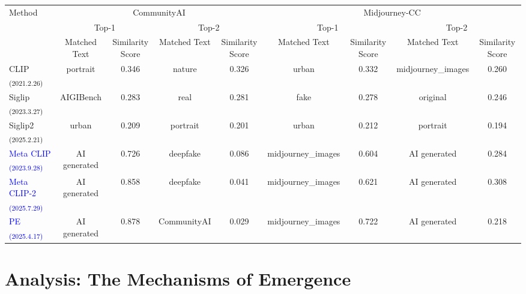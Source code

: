 \documentclass[sigconf,screen]{acmart}
\theoremstyle{plain}
\theoremstyle{definition}
\theoremstyle{remark}
\begin{document}
\begin{table}[th!]
\begin{adjustbox}{width=0.95\linewidth}
\begin{tabular}{l|cccccccc}
  \bottomrule
  \multirow{3}{*}{Method} & \multicolumn{4}{c}{CommunityAI}& \multicolumn{4}{c}{Midjourney-CC} \\
  \cmidrule(r){2-5} \cmidrule(r){6-9}
   & \multicolumn{2}{c}{Top-1} & \multicolumn{2}{c}{Top-2} & \multicolumn{2}{c}{Top-1} & \multicolumn{2}{c}{Top-2} \\
      \cmidrule(r){2-3} \cmidrule(r){4-5} \cmidrule{6-7} \cmidrule{8-9}

&Matched Text& Similarity Score&Matched Text& Similarity Score&Matched Text& Similarity Score&Matched Text& Similarity Score\\
    \midrule

  CLIP \textsubscript{(2021.2.26)}&portrait&0.346&nature&0.326&urban&0.332&midjourney\_images&0.260 \\
  Siglip \textsubscript{(2023.3.27)}&AIGIBench&0.283&real&0.281&fake&0.278&original&0.246\\
  Siglip2 \textsubscript{(2025.2.21)}&urban&0.209&portrait&0.201&urban&0.212&portrait&0.194\\
  \textcolor{blue}{Meta CLIP} \textsubscript{\textcolor{blue}{(2023.9.28)}}&AI generated&0.726&deepfake&0.086&midjourney\_images&0.604&AI generated&0.284\\
  \textcolor{blue}{Meta CLIP-2} \textsubscript{\textcolor{blue}{(2025.7.29)}}&AI generated&0.858&deepfake&0.041&midjourney\_images&0.621&AI generated&0.308\\
  \textcolor{blue}{PE} \textsubscript{\textcolor{blue}{(2025.4.17)}}&AI generated&0.878&CommunityAI&0.029&midjourney\_images&0.722&AI generated&0.218\\

  \bottomrule
   
  \end{tabular}
  \end{adjustbox}
\end{table}

\section{Analysis: The Mechanisms of Emergence}
\label{sec:analysis}
\end{document}
